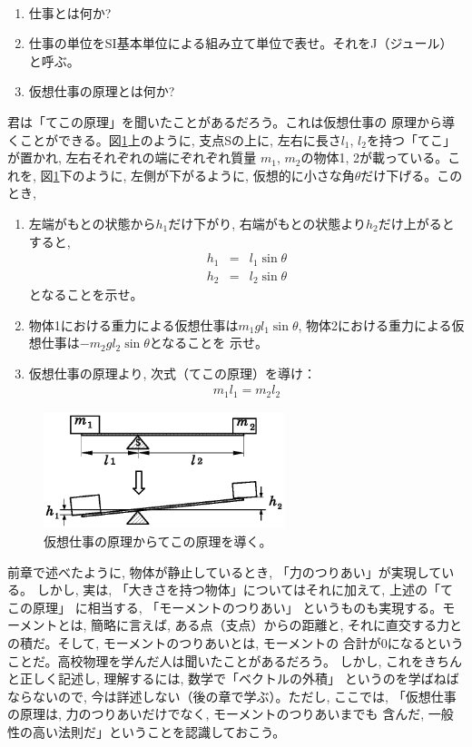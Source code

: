%
\begin{q}\label{q:def_work}　
\begin{enumerate}
\item 仕事とは何か?
\item 仕事の単位をSI基本単位による組み立て単位で表せ。それをJ（ジュール）と呼ぶ。
\item 仮想仕事の原理とは何か? 
\end{enumerate}
\end{q}
\mv

%
\begin{q}\label{q:teko}
君は「てこの原理」を聞いたことがあるだろう。これは仮想仕事の
原理から導くことができる。図\ref{fig:balance}上のように, 支点Sの上に, 
左右に長さ$l_1$, $l_2$を持つ「てこ」が置かれ, 左右それぞれの端にぞれぞれ質量
$m_1$, $m_2$の物体1, 2が載っている。これを, 図\ref{fig:balance}下のように, 
左側が下がるように, 仮想的に小さな角$\theta$だけ下げる。このとき, 
\begin{enumerate}
\item 左端がもとの状態から$h_1$だけ下がり, 右端がもとの状態より$h_2$だけ上がるとすると, 
\begin{eqnarray}
h_1&=&l_1\sin\theta　\\
h_2&=&l_2\sin\theta
\end{eqnarray}
となることを示せ。
\item 物体1における重力による仮想仕事は$m_1gl_1\sin\theta$, 
物体2における重力による仮想仕事は$-m_2gl_2\sin\theta$となることを
示せ。 
\item 仮想仕事の原理より, 次式（てこの原理）を導け：
\begin{eqnarray}
m_1l_1=m_2l_2\label{eq:principle_balance}
\end{eqnarray}
\end{enumerate}
\end{q}
\begin{figure}[h]
    \centering
    \includegraphics[width=7cm]{balance.eps}
    \caption{仮想仕事の原理からてこの原理を導く。}\label{fig:balance}
\end{figure}

前章で述べたように, 物体が静止しているとき, 「力のつりあい」が実現している。
しかし, 実は, 「大きさを持つ物体」についてはそれに加えて, 上述の「てこの原理」
に相当する, 「モーメントのつりあい」
というものも実現する。モーメントとは, 簡略に言えば, ある点（支点）からの距離と, 
それに直交する力との積だ。そして, モーメントのつりあいとは, モーメントの
合計が0になるということだ。高校物理を学んだ人は聞いたことがあるだろう。
しかし, これをきちんと正しく記述し, 理解するには, 数学で「ベクトルの外積」
というのを学ばねばならないので, 今は詳述しない（後の章で学ぶ）。ただし, 
ここでは, 「仮想仕事の原理は, 力のつりあいだけでなく, モーメントのつりあいまでも
含んだ, 一般性の高い法則だ」ということを認識しておこう。\mv

